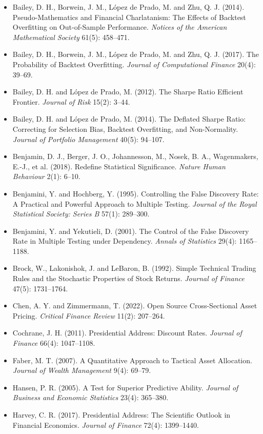 \begin{itemize}
  \item Bailey, D. H., Borwein, J. M., L\'opez de Prado, M. and Zhu, Q. J. (2014). Pseudo-Mathematics and Financial Charlatanism: The Effects of Backtest Overfitting on Out-of-Sample Performance. \emph{Notices of the American Mathematical Society} 61(5): 458--471.
  \item Bailey, D. H., Borwein, J. M., L\'opez de Prado, M. and Zhu, Q. J. (2017). The Probability of Backtest Overfitting. \emph{Journal of Computational Finance} 20(4): 39--69.
  \item Bailey, D. H. and L\'opez de Prado, M. (2012). The Sharpe Ratio Efficient Frontier. \emph{Journal of Risk} 15(2): 3--44.
  \item Bailey, D. H. and L\'opez de Prado, M. (2014). The Deflated Sharpe Ratio: Correcting for Selection Bias, Backtest Overfitting, and Non-Normality. \emph{Journal of Portfolio Management} 40(5): 94--107.
  \item Benjamin, D. J., Berger, J. O., Johannesson, M., Nosek, B. A., Wagenmakers, E.-J., et al. (2018). Redefine Statistical Significance. \emph{Nature Human Behaviour} 2(1): 6--10.
  \item Benjamini, Y. and Hochberg, Y. (1995). Controlling the False Discovery Rate: A Practical and Powerful Approach to Multiple Testing. \emph{Journal of the Royal Statistical Society: Series B} 57(1): 289--300.
  \item Benjamini, Y. and Yekutieli, D. (2001). The Control of the False Discovery Rate in Multiple Testing under Dependency. \emph{Annals of Statistics} 29(4): 1165--1188.
  \item Brock, W., Lakonishok, J. and LeBaron, B. (1992). Simple Technical Trading Rules and the Stochastic Properties of Stock Returns. \emph{Journal of Finance} 47(5): 1731--1764.
  \item Chen, A. Y. and Zimmermann, T. (2022). Open Source Cross-Sectional Asset Pricing. \emph{Critical Finance Review} 11(2): 207--264.
  \item Cochrane, J. H. (2011). Presidential Address: Discount Rates. \emph{Journal of Finance} 66(4): 1047--1108.
  \item Faber, M. T. (2007). A Quantitative Approach to Tactical Asset Allocation. \emph{Journal of Wealth Management} 9(4): 69--79.
  \item Hansen, P. R. (2005). A Test for Superior Predictive Ability. \emph{Journal of Business and Economic Statistics} 23(4): 365--380.
  \item Harvey, C. R. (2017). Presidential Address: The Scientific Outlook in Financial Economics. \emph{Journal of Finance} 72(4): 1399--1440.

\end{itemize}
